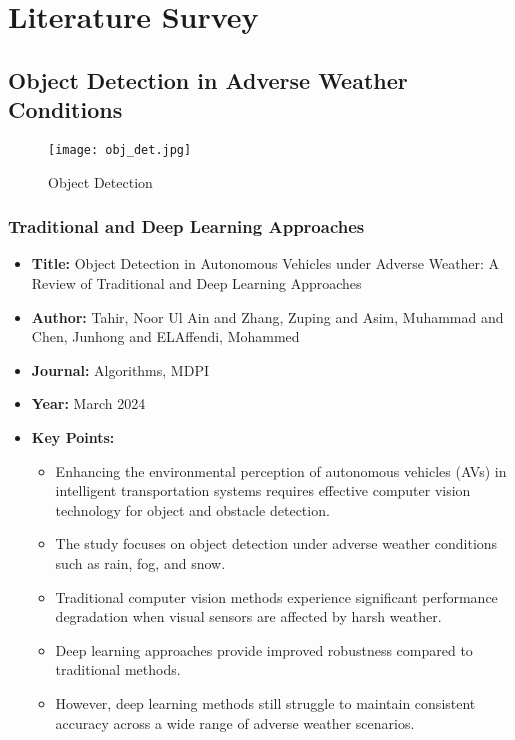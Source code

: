\chapter{Literature Survey}

\section{Object Detection in Adverse Weather Conditions}

\begin{figure}[h]
	\centering
	\texttt{[image: obj\_det.jpg]}
	\caption{Object Detection}
	\label{fig: img2}
\end{figure}

\subsection{Traditional and Deep Learning Approaches}
\begin{itemize}
    \item \textbf{Title:} Object Detection in Autonomous Vehicles under Adverse Weather: A Review of Traditional and Deep Learning Approaches \cite{tahir2024object}
    \item \textbf{Author:} Tahir, Noor Ul Ain and Zhang, Zuping and Asim, Muhammad and Chen, Junhong and ELAffendi, Mohammed
    \item \textbf{Journal:} Algorithms, MDPI
    \item \textbf{Year:} March 2024
    \item \textbf{Key Points:}
    \begin{itemize}
        \item Enhancing the environmental perception of autonomous vehicles (AVs) in intelligent transportation systems requires effective computer vision technology for object and obstacle detection.
        \item The study focuses on object detection under adverse weather conditions such as rain, fog, and snow.
        \item Traditional computer vision methods experience significant performance degradation when visual sensors are affected by harsh weather.
        \item Deep learning approaches provide improved robustness compared to traditional methods.
        \item However, deep learning methods still struggle to maintain consistent accuracy across a wide range of adverse weather scenarios.
    \end{itemize}
\end{itemize}

